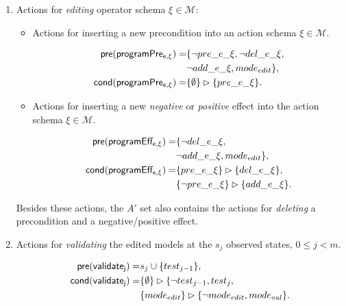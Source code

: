 \documentclass[letterpaper]{article} %
\newcommand{\pre}{\mathsf{pre}}     %
\newcommand{\cond}{\mathsf{cond}}   %
\begin{document}
\begin{itemize}
\begin{enumerate}
\item Actions for {\em editing} operator schema $\xi\in\mathcal{M}$:
\begin{itemize}
\item Actions for inserting a new precondition into an action schema $\xi\in\mathcal{M}$.

\begin{small}
\begin{align*}
\hspace*{7pt}\pre(\mathsf{programPre_{e,\xi}})=&\{\neg pre\_e\_\xi, \neg del\_e\_\xi,\\
& \neg add\_e\_\xi, mode_{edit}\},\\
\cond(\mathsf{programPre_{e,\xi}})=&\{\emptyset\}\rhd\{pre\_e\_\xi\}.
\end{align*}
\end{small}


\item Actions for inserting a new {\em negative} or {\em positive} effect into the action schema $\xi\in\mathcal{M}$.

\begin{small}
\begin{align*}
\hspace*{7pt}\pre(\mathsf{programEff_{e,\xi}})=&\{\neg del\_e\_\xi,\\
& \neg add\_e\_\xi,mode_{edit}\},\\
\cond(\mathsf{programEff_{e,\xi}})=&\{pre\_e\_\xi\}\rhd\{del\_e\_\xi\},\\
&\{\neg pre\_e\_\xi\}\rhd\{add\_e\_\xi\}.
\end{align*}
\end{small}
\end{itemize}
Besides these actions, the $A'$ set also contains the actions for {\em deleting} a precondition and a negative/positive effect.

\item Actions for {\em validating} the edited models at the $s_j$ observed states, {\tt\small $0\leq j< m$}.
\begin{small}
\begin{align*}
\hspace*{7pt}\pre(\mathsf{validate_{j}})=&s_j\cup\{test_{j-1}\},\\
\cond(\mathsf{validate_{j}})=&\{\emptyset\}\rhd\{\neg test_{j-1}, test_j,\\
                            &\{mode_{edit}\}\rhd\{\neg mode_{edit}, mode_{val}\}.
\end{align*}
\end{small}
\end{enumerate}
\end{itemize}
\end{document}
